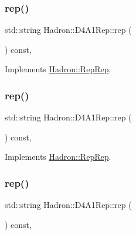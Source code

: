 \subsubsection{\texorpdfstring{rep()}{rep()}\hspace{0.1cm}{\footnotesize\ttfamily [3/5]}}
{\footnotesize\ttfamily std\+::string Hadron\+::\+D4\+A1\+Rep\+::rep (\begin{DoxyParamCaption}{ }\end{DoxyParamCaption}) const\hspace{0.3cm}{\ttfamily [inline]}, {\ttfamily [virtual]}}



Implements \mbox{\hyperlink{structHadron_1_1RepRep_ab3213025f6de249f7095892109575fde}{Hadron\+::\+Rep\+Rep}}.

\mbox{\label{structHadron_1_1D4A1Rep_a935e95f3ad80b6499e276424e3573730}} 
\subsubsection{\texorpdfstring{rep()}{rep()}\hspace{0.1cm}{\footnotesize\ttfamily [4/5]}}
{\footnotesize\ttfamily std\+::string Hadron\+::\+D4\+A1\+Rep\+::rep (\begin{DoxyParamCaption}{ }\end{DoxyParamCaption}) const\hspace{0.3cm}{\ttfamily [inline]}, {\ttfamily [virtual]}}



Implements \mbox{\hyperlink{structHadron_1_1RepRep_ab3213025f6de249f7095892109575fde}{Hadron\+::\+Rep\+Rep}}.

\mbox{\label{structHadron_1_1D4A1Rep_a935e95f3ad80b6499e276424e3573730}} 
\subsubsection{\texorpdfstring{rep()}{rep()}\hspace{0.1cm}{\footnotesize\ttfamily [5/5]}}
{\footnotesize\ttfamily std\+::string Hadron\+::\+D4\+A1\+Rep\+::rep (\begin{DoxyParamCaption}{ }\end{DoxyParamCaption}) const\hspace{0.3cm}{\ttfamily [inline]}, {\ttfamily [virtual]}}




